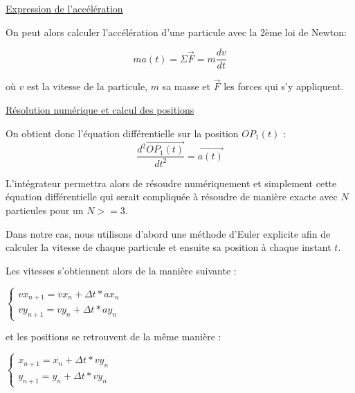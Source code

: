 \vspace{3mm}
\underline{Expression de l'accélération}
\vspace{2mm}

On peut alors calculer l'accélération d'une particule avec la 2ème loi de Newton:

\begin{equation}
ma(t) = \Sigma \Vec{F} = m \frac{dv}{dt}
\end{equation}

où $v$ est la vitesse de la particule, $m$ sa masse et $\vec{F}$ les forces qui s'y appliquent.

\vspace{3mm}
\underline{Résolution numérique et calcul des positions}
\vspace{2mm}

On obtient donc l'équation différentielle sur la position $OP_1(t)$ :
\begin{equation}
\frac{d^2 \vec{OP_1(t)}}{dt^2} = \vec{a(t)}
\end{equation}

L'intégrateur permettra alors de résoudre numériquement et simplement cette équation différentielle qui serait compliquée à résoudre de manière exacte avec $N$ particules pour un $N>=3$.

\vspace{2mm}

Dans notre cas, nous utilisons d'abord une méthode d'Euler explicite afin de calculer la vitesse de chaque particule et ensuite sa position à chaque instant $t$.

Les vitesses s'obtiennent alors de la manière suivante :
\vspace{2mm}

$
\left\{
    \begin{array}{ll}
        vx_{n+1} =vx_{n} + \Delta t *ax_{n} \\
        vy_{n+1} =vy_{n} + \Delta t *ay_{n}
    \end{array}
\right.
$

\vspace{2mm}
et les positions se retrouvent de la même manière :
\vspace{2mm}

$
\left\{
    \begin{array}{ll}
        x_{n+1} =x_{n} + \Delta t *vy_{n} \\
        y_{n+1} =y_{n} + \Delta t *vy_{n}
    \end{array}
\right.
$


